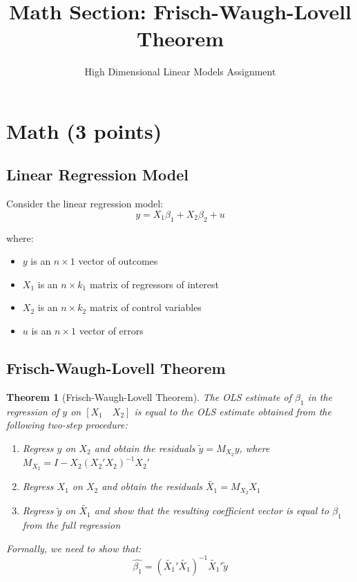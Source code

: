 \documentclass{article}
\title{Math Section: Frisch-Waugh-Lovell Theorem}
\author{High Dimensional Linear Models Assignment}
\date{}
\newtheorem{theorem}{Theorem}
\begin{document}
\maketitle

\section{Math (3 points)}

\subsection{Linear Regression Model}

Consider the linear regression model:
\begin{equation}
y = X_1\beta_1 + X_2\beta_2 + u
\end{equation}

where:
\begin{itemize}
    \item $y$ is an $n \times 1$ vector of outcomes
    \item $X_1$ is an $n \times k_1$ matrix of regressors of interest  
    \item $X_2$ is an $n \times k_2$ matrix of control variables
    \item $u$ is an $n \times 1$ vector of errors
\end{itemize}

\subsection{Frisch-Waugh-Lovell Theorem}

\begin{theorem}[Frisch-Waugh-Lovell Theorem]
The OLS estimate of $\beta_1$ in the regression of $y$ on $[X_1 \quad X_2]$ is equal to the OLS estimate obtained from the following two-step procedure:

\begin{enumerate}
    \item Regress $y$ on $X_2$ and obtain the residuals $\tilde{y} = M_{X_2}y$, where $M_{X_2} = I - X_2(X_2'X_2)^{-1}X_2'$
    \item Regress $X_1$ on $X_2$ and obtain the residuals $\tilde{X_1} = M_{X_2}X_1$  
    \item Regress $\tilde{y}$ on $\tilde{X_1}$ and show that the resulting coefficient vector is equal to $\hat{\beta_1}$ from the full regression
\end{enumerate}

Formally, we need to show that:
\begin{equation}
\hat{\beta_1} = (\tilde{X_1}'\tilde{X_1})^{-1}\tilde{X_1}'\tilde{y}
\end{equation}
\end{theorem}
\end{document}
